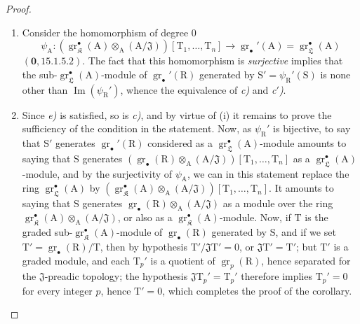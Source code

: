 \begin{proof}
\begin{enumerate}
\item[\rm(i)] Consider the homomorphism of degree $0$
\[
  \psi_\mathrm{A}:(\operatorname{gr}_\mathfrak K^\bullet(\mathrm{A})\otimes_\mathrm{A}(\mathrm{A}/\mathfrak{J}))[\mathrm{T}_1,\ldots,\mathrm{T}_n]\to\operatorname{gr}_\bullet'(\mathrm{A})=\operatorname{gr}_\mathfrak{L}^\bullet(\mathrm{A})
\]
$(\mathbf{0},15.1.5.2)$. The fact that this homomorphism is \emph{surjective} implies that the sub-$\operatorname{gr}_\mathfrak{L}^\bullet(\mathrm{A})$-module of $\operatorname{gr}_\bullet'(\mathrm{R})$ generated by $\mathrm{S}'=\psi_\mathrm{R}'(\mathrm{S})$ is none other than $\operatorname{Im}(\psi_\mathrm{R}')$, whence the equivalence of \emph{c)} and \emph{c$'$)}.

\item[\rm(ii)] Since \emph{e)} is satisfied, so is \emph{c)}, and by virtue of (i) it remains to prove the sufficiency of the condition in the statement. Now, as $\psi_\mathrm{R}'$ is bijective, to say that $\mathrm{S}'$ generates $\operatorname{gr}_\bullet'(\mathrm{R})$ considered as a $\operatorname{gr}_\mathfrak{L}^\bullet(\mathrm{A})$-module amounts to saying that $\mathrm{S}$ generates $(\operatorname{gr}_\bullet(\mathrm{R})\otimes_\mathrm{A}(\mathrm{A}/\mathfrak{J}))[\mathrm{T}_1,\ldots,\mathrm{T}_n]$ as a $\operatorname{gr}_\mathfrak{L}^\bullet(\mathrm{A})$-module, and by the surjectivity of $\psi_\mathrm{A}$, we can in this statement replace the ring $\operatorname{gr}_\mathfrak{L}^\bullet(\mathrm{A})$ by $(\operatorname{gr}_\mathfrak K^\bullet(\mathrm{A})\otimes_\mathrm{A}(\mathrm{A}/\mathfrak{J}))[\mathrm{T}_1,\ldots,\mathrm{T}_n]$. It amounts to saying that $\mathrm{S}$ generates $\operatorname{gr}_\bullet(\mathrm{R})\otimes_\mathrm{A}(\mathrm{A}/\mathfrak{J})$ as a module over the ring $\operatorname{gr}_\mathfrak K^\bullet(\mathrm{A})\otimes_\mathrm{A}(\mathrm{A}/\mathfrak{J})$, or also as a $\operatorname{gr}_\mathfrak K^\bullet(\mathrm{A})$-module. Now, if $\mathrm{T}$ is the graded sub-$\operatorname{gr}_\mathfrak K^\bullet(\mathrm{A})$-module of $\operatorname{gr}_\bullet(\mathrm{R})$ generated by $\mathrm{S}$, and if we set $\mathrm{T}'=\operatorname{gr}_\bullet(\mathrm{R})/\mathrm{T}$, then by hypothesis $\mathrm{T}'/\mathfrak{J}\mathrm{T}'=0$, or $\mathfrak{J}\mathrm{T}'=\mathrm{T}'$; but $\mathrm{T}'$ is a graded module, and each $\mathrm{T}_p'$ is a quotient of $\operatorname{gr}_p(\mathrm{R})$, hence separated for the $\mathfrak{J}$-preadic topology; the hypothesis $\mathfrak{J}\mathrm{T}_p'=\mathrm{T}_p'$ therefore implies $\mathrm{T}_p'=0$ for every integer $p$, hence $\mathrm{T}'=0$, which completes the proof of the corollary.
\end{enumerate}
\end{proof}

